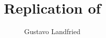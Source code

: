 \documentclass[a4paper,10pt]{article}
\title{Replication of }
\author{Gustavo Landfried}
\begin{document}
\maketitle

\begin{abstract}

\end{abstract}

\section{}
\end{document}
